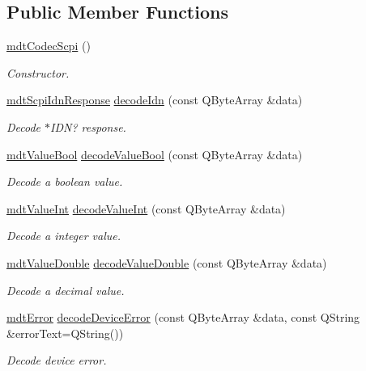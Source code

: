 \subsection*{Public Member Functions}
\begin{DoxyCompactItemize}
\item 
\hyperlink{classmdt_codec_scpi_a47fdbdd5aad517fa72d2350b000b3af2}{mdt\-Codec\-Scpi} ()
\begin{DoxyCompactList}\small\item\em Constructor. \end{DoxyCompactList}\item 
\hyperlink{structmdt_scpi_idn_response}{mdt\-Scpi\-Idn\-Response} \hyperlink{classmdt_codec_scpi_aac894b4a3f64a219c6afa4d178abb49a}{decode\-Idn} (const Q\-Byte\-Array \&data)
\begin{DoxyCompactList}\small\item\em Decode $\ast$\-I\-D\-N? response. \end{DoxyCompactList}\item 
\hyperlink{classmdt_value_bool}{mdt\-Value\-Bool} \hyperlink{classmdt_codec_scpi_aa3a1e848575b3bda9e5356cfab71d3bd}{decode\-Value\-Bool} (const Q\-Byte\-Array \&data)
\begin{DoxyCompactList}\small\item\em Decode a boolean value. \end{DoxyCompactList}\item 
\hyperlink{mdt_value_8h_a0c42952c09d70fdb4d64e2becd58ee3d}{mdt\-Value\-Int} \hyperlink{classmdt_codec_scpi_ae7fe6489561779c8bc1c7a253e1ad194}{decode\-Value\-Int} (const Q\-Byte\-Array \&data)
\begin{DoxyCompactList}\small\item\em Decode a integer value. \end{DoxyCompactList}\item 
\hyperlink{classmdt_value_double}{mdt\-Value\-Double} \hyperlink{classmdt_codec_scpi_a7923c43ae7cd670b2334da396bc00dfe}{decode\-Value\-Double} (const Q\-Byte\-Array \&data)
\begin{DoxyCompactList}\small\item\em Decode a decimal value. \end{DoxyCompactList}\item 
\hyperlink{classmdt_error}{mdt\-Error} \hyperlink{classmdt_codec_scpi_a1372d34a6eea1f83eed7af95a964d7d2}{decode\-Device\-Error} (const Q\-Byte\-Array \&data, const Q\-String \&error\-Text=Q\-String())
\begin{DoxyCompactList}\small\item\em Decode device error. \end{DoxyCompactList}\item 

\end{DoxyCompactItemize}
